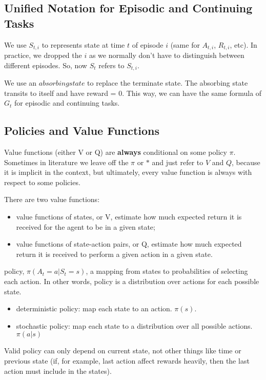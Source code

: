 \documentclass[sutton_barto_notes.tex]{subfiles}
\begin{document}
\subsection{Unified Notation for Episodic and Continuing Tasks}

We use $S_{t,i}$ to represents state at time $t$ of episode $i$ (same for $A_{t,i}$, $R_{t,i}$, etc).
In practice, we dropped the $i$ as we normally don't have to distinguish between different episodes.
So, now $S_t$ refers to $S_{t,i}$.

We use an $absorbing state$ to replace the terminate state. The absorbing state transits to itself and have reward = 0.
This way, we can have the same formula of $G_t$ for episodic and continuing tasks.

\subsection{Policies and Value Functions}

Value functions (either V or Q) are \textbf{always} conditional on some policy $\pi$. Sometimes in literature we leave off the $\pi$ or $*$ and just refer to $V$ and $Q$, because it is implicit in the context, but ultimately, every value function is always with respect to some policies.

\begin{definition}
There are two value functions:
\begin{itemize}
\item value functions of states, or V, estimate how much expected return it is received for the agent to be in a given state;
\item value functions of state-action pairs, or Q, estimate how much expected return it is received to perform a given action in a given state.
\end{itemize}
\end{definition}

\begin{definition}
policy, $\pi(A_t=a|S_t=s)$, a mapping from states to probabilities of selecting each action. In other words, policy is a distribution over actions for each possible state.
\end{definition}
\begin{itemize}
\item deterministic policy: map each state to an action. $\pi(s)$. 
\item stochastic policy: map each state to a distribution over all possible actions. $\pi(a|s)$
\end{itemize}
Valid policy can only depend on current state, not other things like time or previous state (if, for example, last action affect rewards heavily, then the last action must include in the states). 
\newline
\end{document}
